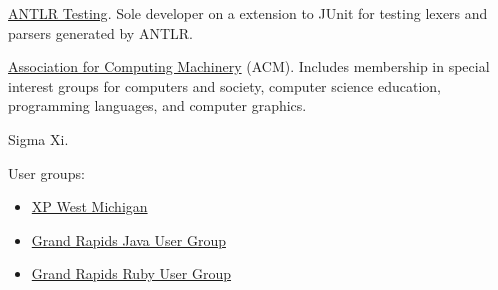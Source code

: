 \documentclass[ComputerScience]{vita}
\begin{document}
\begin{vita}
\begin{software}
  \item \href{http://antlr-testing.sourceforge.net/}{ANTLR Testing}.  Sole developer on a extension to JUnit for testing lexers and parsers generated by ANTLR.

\end{software}


\begin{Memberships}

\item \href{http://www.acm.org/}{Association for Computing Machinery} (ACM).  Includes membership in special interest groups for computers and society, computer science education, programming languages, and computer graphics.

\item Sigma Xi.

\item User groups:
  \begin{itemize}
  \item \hspace{-\leftmargini}\href{http://www.xpwestmichigan.org/}{XP West Michigan} 
  \item \hspace{-\leftmargini}\href{http://www.gr-jug.org/}{Grand Rapids Java User Group}
  \item \hspace{-\leftmargini}\href{http://gr-ruby.org/}{Grand Rapids Ruby User Group}
  \end{itemize}

\end{Memberships}


\end{vita}
\end{document}
